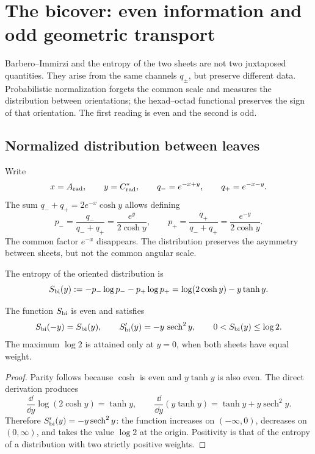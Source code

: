 \chapter{The bicover: even information and odd geometric transport}
\label{chap:paridad-bicapa-barbero-rev6}

Barbero--Immirzi and the entropy of the two sheets are not two juxtaposed
quantities. They arise from the same channels \(q_\pm\), but preserve
different data. Probabilistic normalization forgets the common scale and
measures the distribution between orientations; the hexad--octad functional preserves the
sign of that orientation. The first reading is even and the second is odd.

\section{Normalized distribution between leaves}

Write
\[
 x=A_{\rm rad},
 \qquad
 y=C^*_{\rm rad},
 \qquad
 q_-=e^{-x+y},
 \qquad
 q_+=e^{-x-y}.
\]
The sum \(q_-+q_+=2e^{-x}\cosh y\) allows defining
\[
 p_-=\frac{q_-}{q_-+q_+}
     =\frac{e^y}{2\cosh y},
 \qquad
 p_+=\frac{q_+}{q_-+q_+}
     =\frac{e^{-y}}{2\cosh y}.
\]
The common factor \(e^{-x}\) disappears. The distribution preserves the asymmetry
between sheets, but not the common angular scale.

\begin{definition}
\label{def:entropia-bicapa-rev6}
The entropy of the oriented distribution is
\[
 S_{\rm bi}(y)
 :=
 -p_-\log p_--p_+\log p_+
 =
 \log(2\cosh y)-y\tanh y.
\]
\end{definition}

\begin{proposition}
\label{prop:paridad-entropia-bicapa-rev6}
The function \(S_{\rm bi}\) is even and satisfies
\[
 S_{\rm bi}(-y)=S_{\rm bi}(y),
 \qquad
 S_{\rm bi}'(y)=-y\,\operatorname{sech}^2y,
 \qquad
 0<S_{\rm bi}(y)\leq\log2.
\]
The maximum \(\log2\) is attained only at \(y=0\), when both sheets
have equal weight.
\end{proposition}

\begin{proof}
Parity follows because \(\cosh\) is even and \(y\tanh y\) is also even.
The direct derivation produces
\[
 \frac{\dd}{\dd y}\log(2\cosh y)=\tanh y,
 \qquad
 \frac{\dd}{\dd y}(y\tanh y)
 =\tanh y+y\operatorname{sech}^2y.
\]
Therefore \(S_{\rm bi}'(y)=-y\operatorname{sech}^2y\): the function increases on
\((-\infty,0)\), decreases on \((0,\infty)\), and takes the value
\(\log2\) at the origin. Positivity is that of the entropy of a distribution with two
strictly positive weights.
\end{proof}

